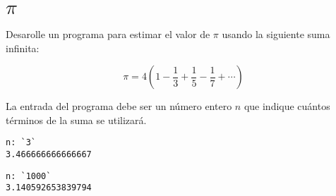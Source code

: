 \section{$\pi$}

Desarolle un programa para estimar el valor de
\href{http://es.wikipedia.org/wiki/N\%C3\%BAmero\_\%CF\%80}{\(\pi\)} usando la
siguiente suma infinita:

\[\pi = 4 \left(1-\frac{1}{3}+\frac{1}{5}-\frac{1}{7}+ \cdots \right)\]

La entrada del programa debe ser un número entero \(n\) que indique
cuántos términos de la suma se utilizará.

\begin{lstlisting}[language=testcase]
n: `3`
3.466666666666667
\end{lstlisting}

\begin{lstlisting}[language=testcase]
n: `1000`
3.140592653839794
\end{lstlisting}
